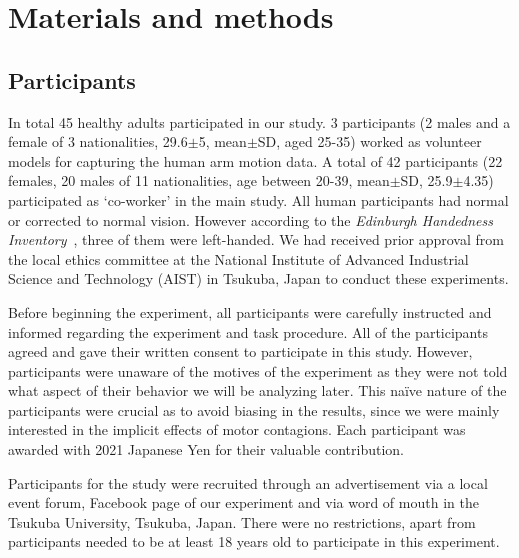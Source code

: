 \section{Materials and methods}\label{roman method}

\subsection{Participants}

In total 45 healthy adults participated in our study. 3 participants (2 males and a female of 3 nationalities, 29.6$\pm$5, mean$\pm$SD, aged 25-35) worked as volunteer models for capturing the human arm motion data. A total of 42 participants (22 females, 20 males of 11 nationalities, age between 20-39, mean$\pm$SD, 25.9$\pm$4.35) participated as `co-worker' in the main study. All human participants had normal or corrected to normal vision. However according to the {\it Edinburgh Handedness Inventory}~\cite{robinson2013edinburgh}, three of them were left-handed. We had received prior approval from the local ethics committee at the National Institute of Advanced Industrial Science and Technology (AIST) in Tsukuba, Japan to conduct these experiments.

Before beginning the experiment, all participants were carefully instructed and informed regarding the experiment and task procedure. All of the participants agreed and gave their written consent to participate in this study. However, participants were unaware of the motives of the experiment as they were not told what aspect of their behavior we will be analyzing later. This na\"ive nature of the participants were crucial as to avoid biasing in the results, since we were mainly interested in the implicit effects of motor contagions. Each participant was awarded with 2021 Japanese Yen for their valuable contribution.

Participants for the study were recruited through an advertisement via a local event forum, Facebook page of our experiment and via word of mouth in the Tsukuba University, Tsukuba, Japan. There were no restrictions, apart from participants needed to be at least 18 years old to participate in this experiment.


